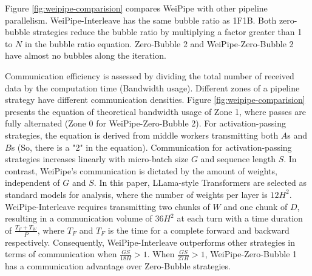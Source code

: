 \documentclass[sigplan,review,anonymous]{acmart}
\begin{document}
Figure \ref{fig:weipipe-comparision} compares WeiPipe with other pipeline parallelism. WeiPipe-Interleave has the same bubble ratio as 1F1B. Both zero-bubble strategies reduce the bubble ratio by multiplying a factor greater than 1 to $N$ in the bubble ratio equation. Zero-Bubble 2 and WeiPipe-Zero-Bubble 2 have almost no bubbles along the iteration. 


Communication efficiency is assessed by dividing the total number of received data by the computation time (Bandwidth usage). Different zones of a pipeline strategy have different communication densities. Figure \ref{fig:weipipe-comparision} presents the equation of theoretical bandwidth usage of Zone 1, where passes are fully alternated (Zone 0 for WeiPipe-Zero-Bubble 2). For activation-passing strategies, the equation is derived from middle workers transmitting both $A$s and $B$s (So, there is a "2" in the equation). Communication for activation-passing strategies increases linearly with micro-batch size $G$ and sequence length $S$. In contrast, WeiPipe’s communication is dictated by the amount of weights, independent of $G$ and $S$. In this paper, LLama-style Transformers are selected as standard models for analysis, where the number of weights per layer is $12H^2$. WeiPipe-Interleave requires transmitting two chunks of $W$ and one chunk of $D$, resulting in a communication volume of $36H^2$ at each turn with a time duration of $\frac{T_F + T_W}{P}$, where $T_F$ and $T_F$ is the time for a complete forward and backward respectively. Consequently, WeiPipe-Interleave outperforms other strategies in terms of communication when $\frac{GS}{18H} > 1$. When $\frac{GS}{27H} > 1$, WeiPipe-Zero-Bubble 1 has a communication advantage over Zero-Bubble strategies.


\end{document}

